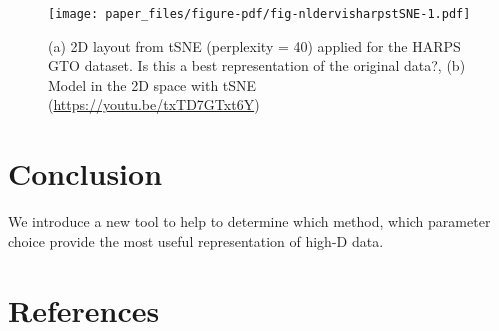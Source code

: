 \documentclass[
  12pt]{article}
\begin{document}
\begin{figure}

{\centering \texttt{[image: paper\_files/figure-pdf/fig-nldervisharpstSNE-1.pdf]}

}

\caption{\label{fig-nldervisharpstSNE}(a) 2D layout from tSNE
(perplexity = 40) applied for the HARPS GTO dataset. Is this a best
representation of the original data?, (b) Model in the 2D space with
tSNE (\url{https://youtu.be/txTD7GTxt6Y})}

\end{figure}

\hypertarget{sec-conclusion}{%
\section{Conclusion}\label{sec-conclusion}}

We introduce a new tool to help to determine which method, which
parameter choice provide the most useful representation of high-D data.

\hypertarget{references}{%
\section*{References}\label{references}}

\renewcommand{\bibsection}{}


\newpage{}
\end{document}

